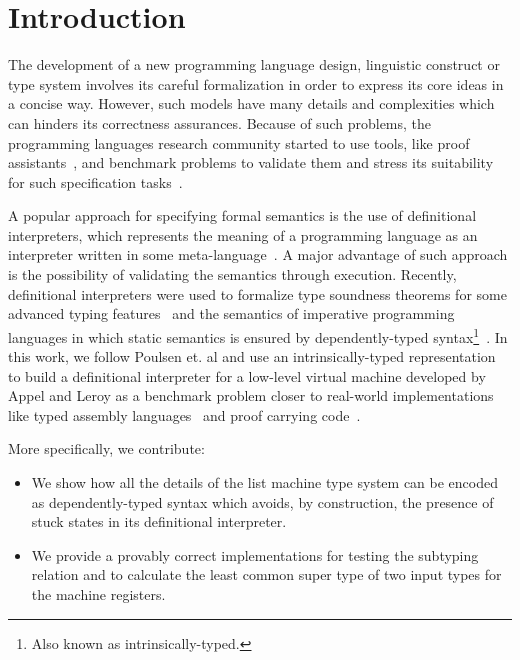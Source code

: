 \documentclass[sigconf]{acmart}
\theoremstyle{definition}
\begin{document}



\section{Introduction}

The development of a new programming language design, linguistic construct
or type system involves its careful formalization in order to express
its core ideas in a concise way. However, such models have many details
and complexities which can hinders its correctness assurances.
Because of such problems, the programming languages research community
started to use tools, like proof assistants~\cite{Stump16,Chlipala13},
and benchmark problems to validate them and stress its suitability for
such specification tasks~\cite{Aydemir05,Pientka18,Appel07}.

A popular approach for specifying formal semantics is the
use of definitional interpreters, which represents the meaning of a
programming language as an interpreter written in some
meta-language~\cite{Reynolds72}. A major advantage of such approach
is the possibility of validating the semantics through execution.
Recently, definitional interpreters were used to formalize type
soundness theorems for some advanced typing features~\cite{Amin17}
and the semantics of imperative programming languages in which static
semantics is ensured by dependently-typed
syntax\footnote{Also known as intrinsically-typed.}~\cite{Poulsen18}.
In this work, we follow Poulsen et. al and use an intrinsically-typed
representation to build a definitional interpreter for a low-level virtual
machine developed by Appel and Leroy as a benchmark problem closer to
real-world implementations like typed assembly languages~\cite{CraryM99} and
proof carrying code~\cite{Necula97}.

More specifically, we contribute:

\begin{itemize}
  \item We show how all the details of the list machine type system
        can be encoded as dependently-typed syntax which avoids, by construction,
        the presence of stuck states in its definitional interpreter.
  \item We provide a provably correct implementations for testing the subtyping
        relation and to calculate the least common super type of two input
        types for the machine registers.
\end{itemize}
\end{document}
